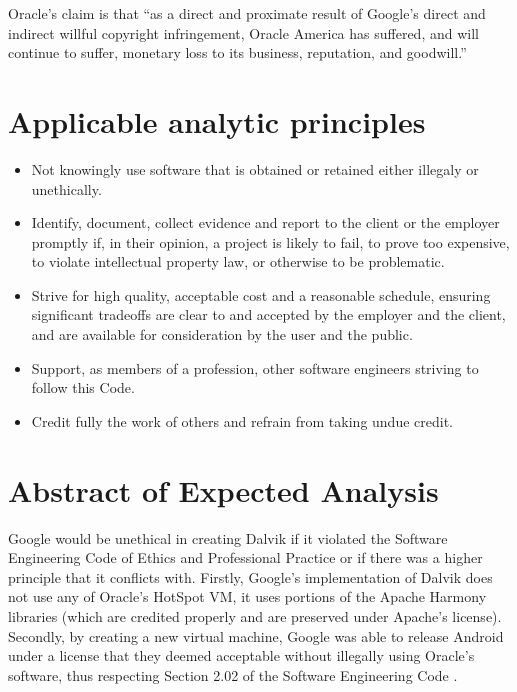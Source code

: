 \documentclass[12pt]{article}
\begin{document}
Oracle's claim is that ``as a direct and proximate result of Google’s direct
and indirect willful copyright infringement, Oracle America has suffered, and
will continue to suffer, monetary loss to its business, reputation, and
goodwill.'' \cite[p.~9 line 11]{oracle-lawsuit}

\section{Applicable analytic principles}

\begin{itemize}
    \item \cite[\S 2.02]{secode} Not knowingly use software that is obtained or
    retained either illegaly or unethically.

    \item \cite[\S 2.06]{secode} Identify, document, collect evidence and
    report to the client or the employer promptly if, in their opinion, a
    project is likely to fail, to prove too expensive, to violate intellectual
    property law, or otherwise to be problematic.

    \item \cite[\S 3.01]{secode} Strive for high quality, acceptable cost and a
    reasonable schedule, ensuring significant tradeoffs are clear to and
    accepted by the employer and the client, and are available for
    consideration by the user and the public.

    \item \cite[\S 6.04]{secode} Support, as members of a profession, other
    software engineers striving to follow this Code.

    \item \cite[\S 7.03]{secode} Credit fully the work of others and refrain
    from taking undue credit.
\end{itemize}

\section{Abstract of Expected Analysis}

Google would be unethical in creating Dalvik if it violated the Software
Engineering Code of Ethics and Professional Practice \cite{secode} or if there
was a higher principle that it conflicts with.  Firstly, Google's
implementation of Dalvik does not use any of Oracle's HotSpot VM, it uses
portions of the Apache Harmony libraries (which are credited properly
\cite{dalvik-readme} and are preserved under Apache's license).  Secondly, by
creating a new virtual machine, Google was able to release Android under a
license that they deemed acceptable without illegally using Oracle's software,
thus respecting Section 2.02 of the Software Engineering Code \cite{secode}.
\end{document}
